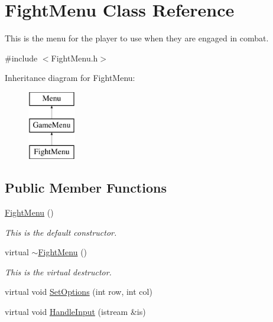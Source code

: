 \hypertarget{classFightMenu}{\section{Fight\-Menu Class Reference}
\label{classFightMenu}
}


This is the menu for the player to use when they are engaged in combat.  




{\ttfamily \#include $<$Fight\-Menu.\-h$>$}

Inheritance diagram for Fight\-Menu\-:\begin{figure}[H]
\begin{center}
\leavevmode
\includegraphics[height=3.000000cm]{classFightMenu}
\end{center}
\end{figure}
\subsection*{Public Member Functions}
\begin{DoxyCompactItemize}
\item 
\hypertarget{classFightMenu_a9f030d9a49e5b81dbaea8eab936cdf80}{\hyperlink{classFightMenu_a9f030d9a49e5b81dbaea8eab936cdf80}{Fight\-Menu} ()}\label{classFightMenu_a9f030d9a49e5b81dbaea8eab936cdf80}

\begin{DoxyCompactList}\small\item\em This is the default constructor. \end{DoxyCompactList}\item 
\hypertarget{classFightMenu_a8a8792d7c674b0f19cdc9bf3a5ae96ca}{virtual \hyperlink{classFightMenu_a8a8792d7c674b0f19cdc9bf3a5ae96ca}{$\sim$\-Fight\-Menu} ()}\label{classFightMenu_a8a8792d7c674b0f19cdc9bf3a5ae96ca}

\begin{DoxyCompactList}\small\item\em This is the virtual destructor. \end{DoxyCompactList}\item 
virtual void \hyperlink{classFightMenu_a46b68aa18df4892d615573fee50e9bc8}{Set\-Options} (int row, int col)
\item 
virtual void \hyperlink{classFightMenu_a6d69cf9a19e7bae304d5a116285c1a51}{Handle\-Input} (istream \&is)
\end{DoxyCompactItemize}

